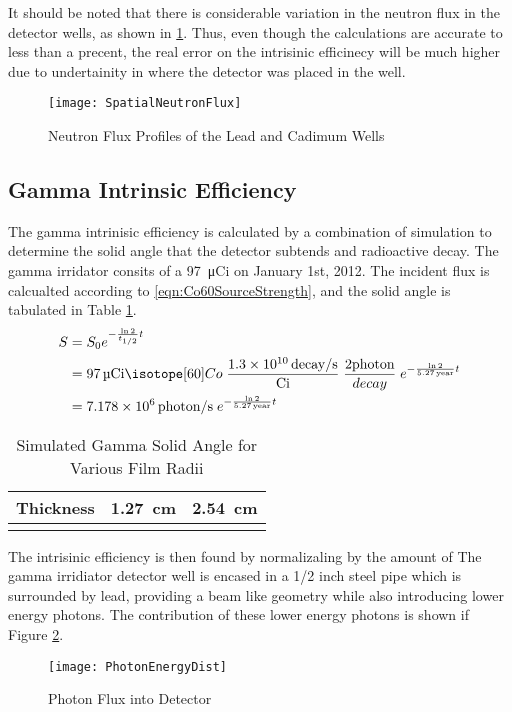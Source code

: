\documentclass[draftcls,onecolumn]{IEEEtran}
\begin{document}
It should be noted that there is considerable variation in the neutron flux in the detector wells, as shown in \ref{fig:NeutronFluxProfiles}.
Thus, even though the calculations are accurate to less than a precent, the real error on the intrisinic efficinecy will be much higher due to undertainity in where the detector was placed in the well.
\begin{figure}
	\texttt{[image: SpatialNeutronFlux]}
  \caption{Neutron Flux Profiles of the Lead and Cadimum Wells}
  \label{fig:NeutronFluxProfiles}
\end{figure}

\subsection{Gamma Intrinsic Efficiency}
The gamma intrinisic efficiency is calculated by a combination of simulation to determine the solid angle that the detector subtends and radioactive decay.
The gamma irridator consits of a \SI{97}{\micro Ci}  on January 1st, 2012.
The incident flux is calcualted according to \eqref{eqn:Co60SourceStrength}, and the solid angle is tabulated in Table \ref{tab:GammaSolidAngle}.
\begin{align}
  \label{eqn:Co60SourceStrength}
  S &= S_0 e^{-\frac{\ln{2}}{t_{1/2}} t} \\ \notag 
    &= \SI{97}{\micro Ci} \iso[60]{Co}\; \frac{\SI{1.3E10}{decay\per\second}}{\si{Ci}} \;\frac{2\text{photon}}{decay}\;e^{-\frac{ \ln{2}}{\SI{5.27}{year}}t}  \\ \notag
    &= \SI{7.178E6}{photon\per\second}\;e^{-\frac{ \ln{2}}{\SI{5.27}{year}}t} 
\end{align}
\begin{table}
	\centering
	\caption{Simulated Gamma Solid Angle for Various Film Radii}
	\label{tab:GammaSolidAngle}
	\begin{tabular}{c | c c}
 		Thickness & \SI{1.27}{\cm} & \SI{2.54}{\cm} \\ \hline
		& & 
	\end{tabular}
\end{table}
The intrisinic efficiency is then found by normalizaling by the amount of  
The gamma irridiator detector well is encased in a 1/2 inch steel pipe which is surrounded by lead, providing a beam like geometry while also introducing lower energy photons. 
The contribution of these lower energy photons is shown if Figure \ref{fig:PhotonFluxAllEnergies}.
\begin{figure}
  \texttt{[image: PhotonEnergyDist]}
	\caption{Photon Flux into Detector}
  \label{fig:PhotonFluxAllEnergies}
\end{figure}
\end{document}
